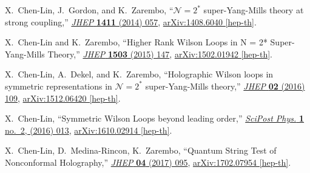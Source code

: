 \documentclass{UUThesisTemplate}
\begin{document}
\frontmatter
    \frontmatterCS 
 
 
    \begin{listofpapers}
	\item
X.~Chen-Lin, J.~Gordon, and K.~Zarembo, ``{$ \mathcal{N}={2}^*$
  super-Yang-Mills theory at strong coupling},''
  \href{http://dx.doi.org/10.1007/JHEP11(2014)057}{{\em JHEP} {\bfseries 1411}
  (2014) 057},
\href{http://arxiv.org/abs/1408.6040}{{\ttfamily arXiv:1408.6040 [hep-th]}}.
	\item
X.~Chen-Lin and K.~Zarembo, ``{Higher Rank Wilson Loops in N = 2*
  Super-Yang-Mills Theory},''
  \href{http://dx.doi.org/10.1007/JHEP03(2015)147}{{\em JHEP} {\bfseries 1503}
  (2015) 147},
\href{http://arxiv.org/abs/1502.01942}{{\ttfamily arXiv:1502.01942 [hep-th]}}.	
	\item
X.~Chen-Lin, A.~Dekel, and K.~Zarembo, ``{Holographic Wilson loops in symmetric
  representations in $ \mathcal{N} = {2}^{\ast } $ super-Yang-Mills theory},''
  \href{http://dx.doi.org/10.1007/JHEP02(2016)109}{{\em JHEP} {\bfseries 02}
  (2016) 109},
\href{http://arxiv.org/abs/1512.06420}{{\ttfamily arXiv:1512.06420 [hep-th]}}.	
	\item
X.~Chen-Lin, ``{Symmetric Wilson Loops beyond leading order},''
  \href{http://dx.doi.org/10.21468/SciPostPhys.1.2.013}{{\em SciPost Phys.}
  {\bfseries 1} no.~2, (2016) 013},
\href{http://arxiv.org/abs/1610.02914}{{\ttfamily arXiv:1610.02914 [hep-th]}}.
    	\item 
X.~Chen-Lin, D.~Medina-Rincon, 	K.~Zarembo, ``{Quantum String Test of
  Nonconformal Holography},''
  \href{http://dx.doi.org/10.1007/JHEP04(2017)095}{{\em JHEP} {\bfseries 04}
  (2017) 095},
\href{http://arxiv.org/abs/1702.07954}{{\ttfamily arXiv:1702.07954 [hep-th]}}.
    	\label{apaperlabel}
    \end{listofpapers}
    
    
    \begingroup
        \tableofcontents
    \endgroup
    
\end{document}
